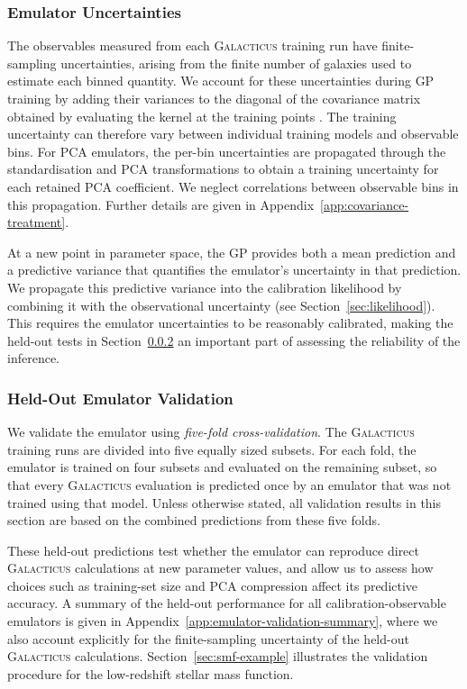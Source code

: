 \documentclass[twocolumn, apj, numberedappendix, iop]{openjournal}
\newcommand{\galacticus}{\textsc{Galacticus}\xspace}
\begin{document}
\subsubsection{Emulator Uncertainties}

The observables measured from each \galacticus{} training run have
finite-sampling uncertainties, arising from the finite number of galaxies used
to estimate each binned quantity. We account for these uncertainties during GP
training by adding their variances to the diagonal of the covariance matrix
obtained by evaluating the kernel at the training points
\citep[e.g.][]{2006gpml.book.....R}. The training uncertainty can therefore vary between individual training models and observable bins.
For PCA emulators, the
per-bin uncertainties are propagated through the standardisation and PCA
transformations to obtain a training uncertainty for each retained PCA
coefficient. We neglect correlations between observable bins in this
propagation. Further details are given in
Appendix~\ref{app:covariance-treatment}.

At a new point in parameter space, the GP provides both a mean prediction and
a predictive variance that quantifies the emulator's uncertainty in that
prediction. We propagate this predictive variance into the calibration
likelihood by combining it with the observational uncertainty (see
Section~\ref{sec:likelihood}). This requires the emulator uncertainties to be
reasonably calibrated, making the held-out tests in
Section~\ref{sec:emulator-validation} an important part of assessing the
reliability of the inference.


\subsubsection{Held-Out Emulator Validation}
\label{sec:emulator-validation}

We validate the emulator using \emph{five-fold cross-validation}.
The \galacticus{} training runs are divided into five equally sized subsets.
For each fold, the emulator is trained on four subsets and evaluated on the remaining subset, so that every \galacticus{} evaluation is predicted once by an emulator that was not trained using that model.
Unless otherwise stated, all validation results in this section are based on the combined predictions from these five folds.

These held-out predictions test whether the emulator can reproduce direct \galacticus{} calculations at new parameter values, and allow us to assess how choices such as training-set size and PCA compression affect its predictive accuracy.
A summary of the held-out performance for all calibration-observable emulators is given in Appendix~\ref{app:emulator-validation-summary}, where we also account explicitly for the finite-sampling uncertainty of the held-out \galacticus{} calculations.
Section~\ref{sec:smf-example} illustrates the validation procedure for the low-redshift stellar mass function.
\end{document}
